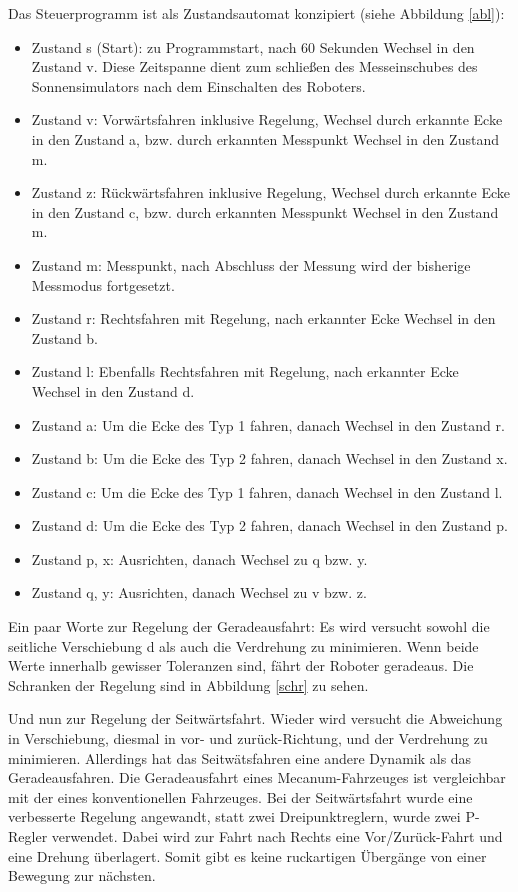 \documentclass[a4paper,bibtotoc,oneside]{scrbook}
\begin{document}
Das Steuerprogramm ist als Zustandsautomat konzipiert (siehe Abbildung \ref{abl}):
\begin{itemize}
\item Zustand s (Start): zu Programmstart, nach 60 Sekunden Wechsel in den Zustand v. Diese Zeitspanne dient zum schließen des Messeinschubes des Sonnensimulators nach dem Einschalten des Roboters.
\item Zustand v: Vorwärtsfahren inklusive Regelung, Wechsel durch erkannte Ecke in den Zustand a, bzw. durch erkannten Messpunkt Wechsel in den Zustand m.
\item Zustand z: Rückwärtsfahren inklusive Regelung, Wechsel durch erkannte Ecke in den Zustand c, bzw. durch erkannten Messpunkt Wechsel in den Zustand m.
\item Zustand m: Messpunkt, nach Abschluss der Messung wird der bisherige Messmodus fortgesetzt.
\item Zustand r: Rechtsfahren mit Regelung, nach erkannter Ecke Wechsel in den Zustand b.
\item Zustand l: Ebenfalls Rechtsfahren mit Regelung, nach erkannter Ecke Wechsel in den Zustand d.
\item Zustand a: Um die Ecke des Typ 1 fahren, danach Wechsel in den Zustand r. 
\item Zustand b: Um die Ecke des Typ 2 fahren, danach Wechsel in den Zustand x.
\item Zustand c: Um die Ecke des Typ 1 fahren, danach Wechsel in den Zustand l. 
\item Zustand d: Um die Ecke des Typ 2 fahren, danach Wechsel in den Zustand p.
\item Zustand p, x: Ausrichten, danach Wechsel zu q bzw. y.
\item Zustand q, y: Ausrichten, danach Wechsel zu v bzw. z.
\end{itemize}

Ein paar Worte zur Regelung der Geradeausfahrt: 
Es wird versucht sowohl die seitliche Verschiebung d als auch die Verdrehung zu minimieren. Wenn beide Werte innerhalb gewisser Toleranzen sind, fährt der Roboter geradeaus. Die Schranken der Regelung sind in Abbildung \ref{schr} zu sehen. 

Und nun zur Regelung der Seitwärtsfahrt. Wieder wird versucht die Abweichung in Verschiebung, diesmal in vor- und zurück-Richtung, und der Verdrehung zu minimieren.  Allerdings hat das Seitwätsfahren eine andere Dynamik als das Geradeausfahren. Die Geradeausfahrt eines Mecanum-Fahrzeuges ist vergleichbar mit der eines konventionellen Fahrzeuges. 
Bei der Seitwärtsfahrt wurde eine verbesserte Regelung angewandt, statt zwei Dreipunktreglern, wurde zwei P-Regler verwendet. Dabei wird zur Fahrt nach Rechts eine Vor/Zurück-Fahrt und eine Drehung überlagert. Somit gibt es keine ruckartigen Übergänge von einer Bewegung zur nächsten.
\end{document}
